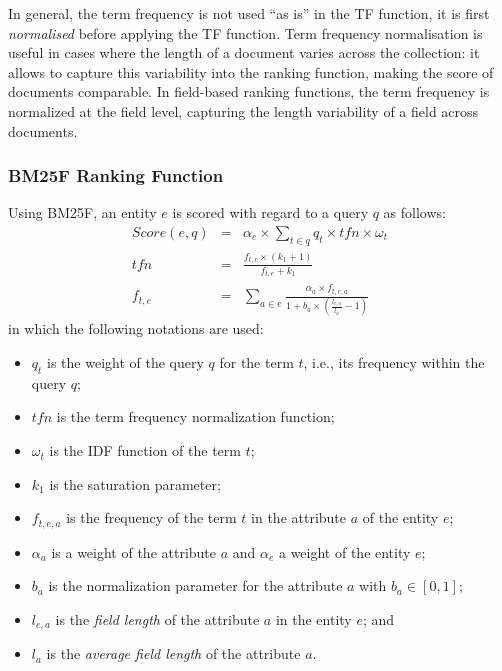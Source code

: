 In general, the term frequency is not used ``as is'' in the TF function, it is first \emph{normalised} before applying the TF function. Term frequency normalisation is useful in cases where the length of a document varies across the collection: it allows to capture this variability into the ranking function, making the score of documents comparable. In field-based ranking functions, the term frequency is normalized at the field level, capturing the length variability of a field across documents.

\subsubsection{BM25F Ranking Function}

Using BM25F, an entity $e$ is scored with regard to a query $q$ as follows:
\begin{eqnarray}
Score(e,q) & = & \alpha_e\times\sum_{t\in q}{q_t\times tfn \times \omega_t}\\
\label{eq:tfidf-score}
tfn & = & \frac{f_{t,e}\times(k_1+1)}{f_{t,e}+k_1} \\
\label{eq:bm25f_2}
f_{t,e} & = &
\sum_{a\in e}{\frac{\alpha_a\times f_{t,e,a}}{1+b_a\times\left(\frac{l_{e,a}}{l_a}-1\right)}}
\label{eq:bm25f_1}
\end{eqnarray}
in which the following notations are used:
\begin{itemize}
	\item $q_t$ is the weight of the query $q$ for the term $t$, i.e., its frequency within the query $q$;
	\item $tfn$ is the term frequency normalization function;
	\item $\omega_t$ is the IDF function of the term $t$;
	\item $k_1$ is the saturation parameter;
	\item $f_{t,e,a}$ is the frequency of the term $t$ in the attribute $a$ of the entity $e$;
	\item $\alpha_a$ is a weight of the attribute $a$ and $\alpha_e$ a weight of the entity $e$;
	\item $b_a$ is the normalization parameter for the attribute $a$ with $b_a \in \left[0,1\right]$;
	\item $l_{e,a}$ is the \emph{field length} of the attribute $a$ in the entity $e$; and
	\item $l_a$ is the \emph{average field length} of the attribute $a$.
\end{itemize}

